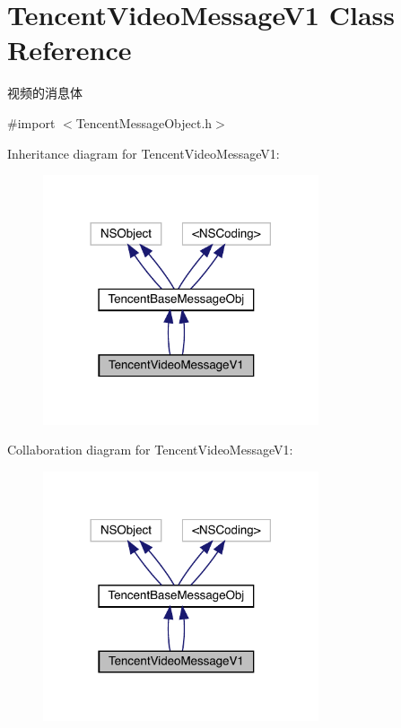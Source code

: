 \hypertarget{interface_tencent_video_message_v1}{}\section{Tencent\+Video\+Message\+V1 Class Reference}
\label{interface_tencent_video_message_v1}


视频的消息体  




{\ttfamily \#import $<$Tencent\+Message\+Object.\+h$>$}



Inheritance diagram for Tencent\+Video\+Message\+V1\+:\nopagebreak
\begin{figure}[H]
\begin{center}
\leavevmode
\includegraphics[width=230pt]{interface_tencent_video_message_v1__inherit__graph}
\end{center}
\end{figure}


Collaboration diagram for Tencent\+Video\+Message\+V1\+:\nopagebreak
\begin{figure}[H]
\begin{center}
\leavevmode
\includegraphics[width=230pt]{interface_tencent_video_message_v1__coll__graph}
\end{center}
\end{figure}
